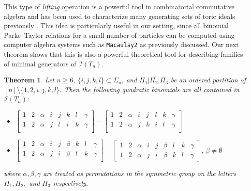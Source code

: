 \documentclass[12pt, reqno]{amsart}
\numberwithin{equation}{section}
\theoremstyle{plain}
\newtheorem{theorem}{Theorem}[section]
\theoremstyle{definition}
\newcommand{\ci}{\mathcal{I}}
\begin{document}
This type of \emph{lifting} operation is a powerful tool in combinatorial commutative algebra and has been used to characterize many generating sets of toric ideals previously \cite{sullivant2007toric}. This idea is particularly useful in our setting, since all binomial Parke--Taylor relations for a small number of particles can be computed using computer algebra systems such as \texttt{Macaulay2} as previously discussed. Our next theorem shows that this is also a powerful theoretical tool for describing families of minimal generators of $\ci(T_n)$. 



\begin{theorem} \label{thm:toricquadratics}
Let $n \geq 6$, $\{i, j, k, l\} \subset \Sigma_n$, and $\Pi_1 | \Pi_2 | \Pi_3 $ be an ordered partition of $[n] \setminus \{1, 2, i, j, k, l\}$. Then the following quadratic binomials are all contained in $\ci(T_n)$:
\begin{itemize}
\item $\begin{bmatrix}
1 & 2 & \alpha & i & j & k & l & \gamma \\
1 & 2 & \alpha & j & l & i & k & \gamma \\ 
\end{bmatrix} - 
\begin{bmatrix}
1 & 2 & \alpha & i & j & l & k & \gamma \\
1 & 2 & \alpha & j & k & i & l & \gamma \\ 
\end{bmatrix} $\\
\item $\begin{bmatrix}
1 & 2 & \alpha & i & j & \beta & k & l & \gamma \\
1 & 2 & \alpha & j & i & \beta & l & k & \gamma \\ 
\end{bmatrix} - 
\begin{bmatrix}
1 & 2 & \alpha & i & j & \beta & l & k & \gamma \\
1 & 2 & \alpha & j & i & \beta & k & l & \gamma
\end{bmatrix}, ~\beta \neq \emptyset$
\end{itemize}
where $\alpha, \beta, \gamma$ are treated as permutations in the symmetric group on the letters $\Pi_1, \Pi_2,$ and $\Pi_3$ respectively. 
\end{theorem}
\end{document}

